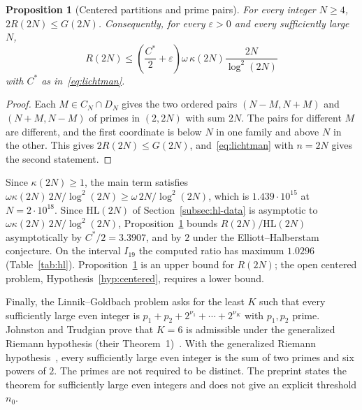 \documentclass[11pt]{amsart}
\newtheorem{Proposition}[Theorem]{Proposition}
\theoremstyle{definition}
\theoremstyle{remark}
\begin{document}
\begin{Proposition}[Centered partitions and prime pairs]\label{prop:R-upper}
For every integer $N\geq 4$, $2R(2N)\leq G(2N)$. Consequently, for every $\varepsilon>0$ and every sufficiently large $N$,
\[
R(2N)\leq\left(\frac{C^*}{2}+\varepsilon\right)\omega\,\kappa(2N)\frac{2N}{\log^2(2N)}
\]
with $C^*$ as in~\eqref{eq:lichtman}.
\end{Proposition}
\begin{proof}
Each $M\in C_N\cap D_N$ gives the two ordered pairs $(N-M,N+M)$ and $(N+M,N-M)$ of primes in $(2,2N)$ with sum $2N$. The pairs for different $M$ are different, and the first coordinate is below $N$ in one family and above $N$ in the other. This gives $2R(2N)\leq G(2N)$, and~\eqref{eq:lichtman} with $n=2N$ gives the second statement.
\end{proof}
Since $\kappa(2N)\geq 1$, the main term satisfies $\omega\kappa(2N)\,2N/\log^2(2N)\geq \omega\,2N/\log^2(2N)$, which is $1.439\cdot 10^{15}$ at $N=2\cdot 10^{18}$. Since $\mathrm{HL}(2N)$ of Section~\ref{subsec:hl-data} is asymptotic to $\omega\kappa(2N)\,2N/\log^2(2N)$, Proposition~\ref{prop:R-upper} bounds $R(2N)/\mathrm{HL}(2N)$ asymptotically by $C^*/2=3.3907$, and by $2$ under the Elliott--Halberstam conjecture. On the interval $I_{19}$ the computed ratio has maximum $1.0296$ (Table~\ref{tab:hl}). Proposition~\ref{prop:R-upper} is an upper bound for $R(2N)$; the open centered problem, Hypothesis~\ref{hyp:centered}, requires a lower bound.

Finally, the Linnik--Goldbach problem asks for the least $K$ such that every sufficiently large even integer is $p_1+p_2+2^{\nu_1}+\cdots+2^{\nu_K}$ with $p_1,p_2$ prime. Johnston and Trudgian prove that $K=6$ is admissible under the generalized Riemann hypothesis (their Theorem~1)~\cite{johnston2026linnik}. With the generalized Riemann hypothesis~\cite{alpoge2026}, every sufficiently large even integer is the sum of two primes and six powers of $2$. The primes are not required to be distinct. The preprint states the theorem for sufficiently large even integers and does not give an explicit threshold $n_0$.
\end{document}
